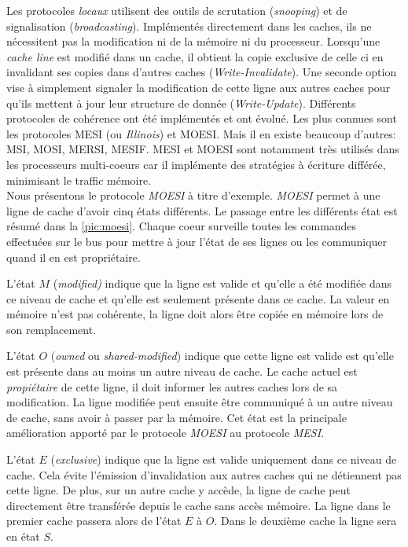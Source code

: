 Les protocoles \textit{locaux} utilisent des outils de scrutation (\textit{snooping}) et de signalisation (\textit{broadcasting}). Implémentés directement dans les caches, ils ne nécessitent pas la modification ni de la mémoire ni du processeur. Lorsqu'une \textit{cache line} est modifié dans un cache, il obtient la copie exclusive de celle ci en invalidant ses copies dans d'autres caches (\textit{Write-Invalidate}). Une seconde option vise à simplement signaler la modification de cette ligne aux autres caches pour qu'ils mettent à jour leur structure de donnée (\textit{Write-Update}).  Différents protocoles de cohérence ont été implémentés et ont évolué. Les plus connues sont les protocoles MESI (ou \textit{Illinois}) \cite{papamarcos1984low} et MOESI. Mais il en existe beaucoup d'autres: MSI, MOSI, MERSI, MESIF. MESI et MOESI sont notamment très utilisés dans les processeurs multi-coeurs car il implémente des stratégies à écriture différée, minimisant le traffic mémoire.
\\
Nous présentons le protocole \textit{MOESI} à titre d'exemple. \textit{MOESI}  permet à une ligne de cache d'avoir cinq états différents. Le passage entre les différents état est résumé dans la \autoref{pic:moesi}. Chaque coeur surveille toutes les commandes effectuées sur le bus pour mettre à jour l'état de ses lignes ou les communiquer quand il en est propriétaire.

L'état $M$ (\textit{modified)} indique que la ligne est valide et qu'elle a été modifiée dans ce niveau de cache et qu'elle est seulement présente dans ce cache. La valeur en mémoire n'est pas cohérente, la ligne doit alors être copiée en mémoire lors de son remplacement. 

L'état $O$ (\textit{owned} ou \textit{shared-modified}) indique que cette ligne est valide est qu'elle est présente dans au moins un autre niveau de cache. Le cache actuel est \textit{propiétaire} de cette ligne, il doit informer les autres caches lors de sa modification. La ligne modifiée peut ensuite être communiqué à un autre niveau de cache, sans avoir à passer par la mémoire. Cet état est la principale amélioration apporté par le protocole \textit{MOESI} au protocole \textit{MESI}.


L'état $E$ (\textit{exclusive}) indique que la ligne est valide uniquement dans ce niveau de cache. Cela évite l'émission d'invalidation aux autres caches qui ne détiennent pas cette ligne. De plus, sur un autre cache y accède, la ligne de cache peut directement être transférée depuis le cache sans accès mémoire. La ligne dans le premier cache passera alors de l'état $E$ à $O$. Dans le deuxième cache la ligne sera en état $S$.

